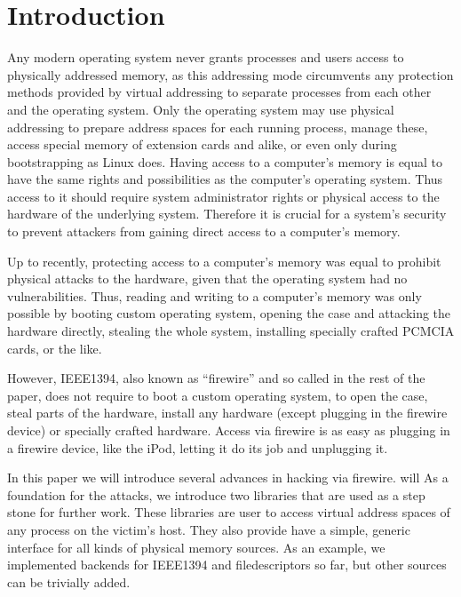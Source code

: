 %
%

\section{Introduction}

Any modern operating system never grants processes and users access to
physically addressed memory, as this addressing mode circumvents any protection
methods provided by virtual addressing to separate processes from each other and
the operating system. Only the operating system may use physical addressing to
prepare address spaces for each running process, manage these, access special
memory of extension cards and alike, or even only during bootstrapping as Linux
does. Having access to a computer's memory is equal to have the same rights and
possibilities as the computer's operating system. Thus access to it should
require system administrator rights or physical access to the hardware of the
underlying system.  Therefore it is crucial for a system's security to prevent
attackers from gaining direct access to a computer's memory.

Up to recently, protecting access to a computer's memory was equal to prohibit
physical attacks to the hardware, given that the operating system had no
vulnerabilities. Thus, reading and writing to a computer's memory was only
possible by booting custom operating system, opening the case and attacking the
hardware directly, stealing the whole system, installing specially crafted
PCMCIA cards, or the like.  

However, IEEE1394, also known as ``firewire'' and so called in the rest of the
paper, does not require to boot a custom operating system, to open the case,
steal parts of the hardware, install any hardware (except plugging in the
firewire device) or specially crafted hardware.  Access via firewire is as easy
as plugging in a firewire device, like the iPod, letting it do its job and
unplugging it.

In this paper we will introduce several advances in hacking via firewire.  will
As a foundation for the attacks, we introduce two libraries that are used as a
step stone for further work. These libraries are user to access virtual address
spaces of any process on the victim's host. They also provide have a simple,
generic interface for all kinds of physical memory sources. As an example, we
implemented backends for IEEE1394 and filedescriptors so far, but other sources
can be trivially added.

